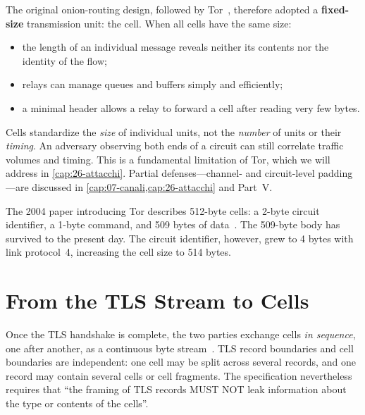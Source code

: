 The original onion-routing design, followed by Tor~\cite{dingledine2004tor}, therefore adopted a \textbf{fixed-size} transmission unit: the cell. When all cells have the same size:
\begin{itemize}
  \item the length of an individual message reveals neither its contents nor the identity of the flow;
  \item relays can manage queues and buffers simply and efficiently;
  \item a minimal header allows a relay to forward a cell after reading very few bytes.
\end{itemize}

\begin{attenzione}
Cells standardize the \emph{size} of individual units, not the \emph{number} of units or their \emph{timing}. An adversary observing both ends of a circuit can still correlate traffic volumes and timing. This is a fundamental limitation of Tor, which we will address in \cref{cap:26-attacchi}. Partial defenses---channel- and circuit-level padding---are discussed in \cref{cap:07-canali,cap:26-attacchi} and Part~V.
\end{attenzione}

\begin{storia}[512 bytes]
The 2004 paper introducing Tor describes 512-byte cells: a 2-byte circuit identifier, a 1-byte command, and 509 bytes of data~\cite{dingledine2004tor}. The 509-byte body has survived to the present day. The circuit identifier, however, grew to 4 bytes with link protocol~4, increasing the cell size to 514 bytes.
\end{storia}

\section{From the TLS Stream to Cells}\label{sec:celle-tls}

Once the TLS handshake is complete, the two parties exchange cells \emph{in sequence}, one after another, as a continuous byte stream~. TLS record boundaries and cell boundaries are independent: one cell may be split across several records, and one record may contain several cells or cell fragments. The specification nevertheless requires that \enquote{the framing of TLS records MUST NOT leak information about the type or contents of the cells}.

